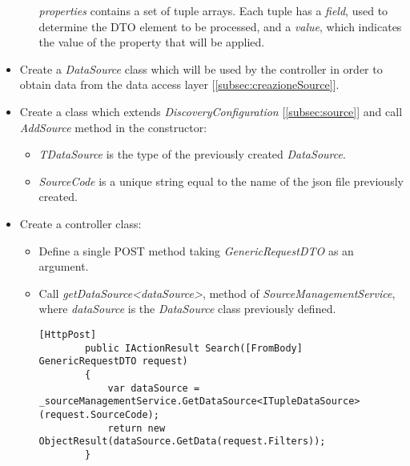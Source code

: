 \begin{itemize}
\begin{itemize}
     \textit{properties} contains a set of tuple arrays. Each tuple has a \textit{field}, used to determine the DTO element to be processed, and a \textit{value}, which indicates the value of the property that will be applied.
    \end{itemize}
    \item Create a \textit{DataSource} class which will be used by the controller in order to obtain data from the data access layer [\ref{subsec:creazioneSource}].
    \item Create a class which extends \textit{DiscoveryConfiguration} [\ref{subsec:source}] and call \textit{AddSource} method in the constructor:
        \begin{itemize}
            
            \begin{lstlisting}[caption={TupleDiscoveryConfiguration example}, style=javaScriptCode]
public class TupleDiscoveryConfiguration : DiscoveryConfiguration
    {
        public TupleDiscoveryConfiguration()
        {
            AddSource(new SourceInfo
            {
                TDataSource = typeof(AllRefusedDataSource),
                SourceCode = "allcode",
                LongText = "All refused",
                ShortText = "All refused"
            });

            AddSource(new SourceInfo
            {
                TDataSource = typeof(RefusedTypeDataSource),
                SourceCode = "refusedtype",
                LongText = "Refused type",
                ShortText = "Refused type"
            });
        }
    }                
            \end{lstlisting}
            \item \textit{TDataSource} is the type of the previously created \textit{DataSource}.
            \item \textit{SourceCode} is a unique string equal to the name of the json file previously created.
        \end{itemize}
    \item Create a controller class:
    \begin{itemize}
        \item Define a single POST method taking \textit{GenericRequestDTO} as an argument.
        \item Call \textit{getDataSource<dataSource>}, method of \textit{SourceManagementService}, where \textit{dataSource} is the \textit{DataSource} class previously defined.
        \begin{lstlisting}[caption={HttpPost request in Controller example}, style=javaScriptCode]
        [HttpPost]
        public IActionResult Search([FromBody] GenericRequestDTO request)
        {
            var dataSource = _sourceManagementService.GetDataSource<ITupleDataSource>(request.SourceCode);
            return new ObjectResult(dataSource.GetData(request.Filters));
        }
        \end{lstlisting}
    \end{itemize}
\end{itemize}
